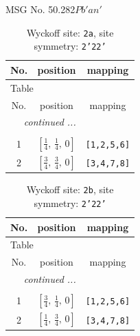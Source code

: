 \documentclass[fleqn,8pt]{jsarticle}
\begin{document}
\setcounter{MaxMatrixCols}{32}

\renewcommand{\tablename}{Table~}
\renewcommand{\figurename}{Figure~}
\begin{center}
\LARGE
MSG No. 50.282\quad$Pb'an'$
\end{center}
\renewcommand{\arraystretch}{1.2}
\begin{longtable}{ccc}
\caption{Wyckoff site: {\tt 2a}, site symmetry: {\tt 2'22'}}
 \\
 \hline \hline
No. & position & mapping \\ \hline \endfirsthead

\multicolumn{2}{l}{\tablename\ \thetable{}} \\
 \hline \hline
No. & position & mapping \\ \hline \endhead

 \hline \hline
\multicolumn{2}{r}{\footnotesize\it continued ...} \\ \endfoot

 \hline \hline
\multicolumn{2}{r}{} \\ \endlastfoot

1 & $\left[ \frac{1}{4},\, \frac{1}{4},\, 0 \right]$ & {\tt [1,2,5,6]} \\ \hline
2 & $\left[ \frac{3}{4},\, \frac{3}{4},\, 0 \right]$ & {\tt [3,4,7,8]} \\
\end{longtable}
\renewcommand{\arraystretch}{1.2}
\begin{longtable}{ccc}
\caption{Wyckoff site: {\tt 2b}, site symmetry: {\tt 2'22'}}
 \\
 \hline \hline
No. & position & mapping \\ \hline \endfirsthead

\multicolumn{2}{l}{\tablename\ \thetable{}} \\
 \hline \hline
No. & position & mapping \\ \hline \endhead

 \hline \hline
\multicolumn{2}{r}{\footnotesize\it continued ...} \\ \endfoot

 \hline \hline
\multicolumn{2}{r}{} \\ \endlastfoot

1 & $\left[ \frac{3}{4},\, \frac{1}{4},\, 0 \right]$ & {\tt [1,2,5,6]} \\ \hline
2 & $\left[ \frac{1}{4},\, \frac{3}{4},\, 0 \right]$ & {\tt [3,4,7,8]} \\
\end{longtable}
\end{document}
